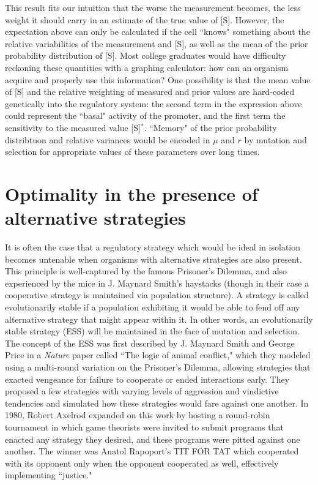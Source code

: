 \documentclass{article}
\begin{document}
This result fits our intuition that the worse the measurement becomes, the less weight it should carry in an estimate of the true value of [S]. However, the expectation above can only be calculated if the cell ``knows" something about the relative variabilities of the measurement and [S], as well as the mean of the prior probability distribution of [S]. Most college graduates would have difficulty reckoning these quantities with a graphing calculator: how can an organism acquire and properly use this information? One possibility is that the mean value of [S] and the relative weighting of measured and prior values are hard-coded genetically into the regulatory system: the second term in the expression above could represent the ``basal" activity of the promoter, and the first term the sensitivity to the measured value [S]$^*$. ``Memory" of the prior probability distribtuon and relative variances would be encoded in $\mu$ and $r$ by mutation and selection for appropriate values of these parameters over long times.

\section*{Optimality in the presence of alternative strategies}

It is often the case that a regulatory strategy which would be ideal in isolation becomes untenable when organisms with alternative strategies are also present. This principle is well-captured by the famous Prisoner's Dilemma, and also experienced by the mice in J. Maynard Smith's haystacks (though in their case a cooperative strategy is maintained via population structure). A strategy is called evolutionarily stable if a population exhibiting it would be able to fend off any alternative strategy that might appear within it. In other words, an evolutionarily stable strategy (ESS) will be maintained in the face of mutation and selection.\\

The concept of the ESS was first described by J. Maynard Smith and George Price in a \textit{Nature} paper called ``The logic of animal conflict," which they modeled using a multi-round variation on the Prisoner's Dilemma, allowing strategies that exacted vengeance for failure to cooperate or ended interactions early. They proposed a few strategies with varying levels of aggression and vindictive tendencies and simulated how these strategies would fare against one another. In 1980, Robert Axelrod expanded on this work by hosting a round-robin tournament in which game theorists were invited to submit programs that enacted any strategy they desired, and these programs were pitted against one another. The winner was Anatol Rapoport's TIT FOR TAT which cooperated with its opponent only when the opponent cooperated as well, effectively implementing ``justice."\\
\end{document}
